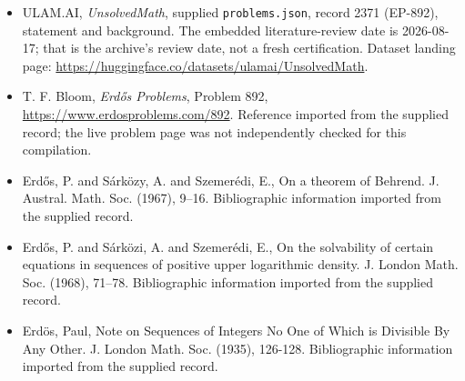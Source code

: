 \documentclass[11pt,a4paper]{article}
\begin{document}
{\small

\begin{itemize}

\item[\hypertarget{source:2371:1}{S1}] ULAM.AI, \emph{UnsolvedMath}, supplied \texttt{problems.json}, record 2371 (EP-892), statement and background. The embedded literature-review date is 2026-08-17; that is the archive’s review date, not a fresh certification. Dataset landing page: \url{https://huggingface.co/datasets/ulamai/UnsolvedMath}.

\item[\hypertarget{source:2371:2}{S2}] T. F. Bloom, \emph{Erdős Problems}, Problem 892, \url{https://www.erdosproblems.com/892}. Reference imported from the supplied record; the live problem page was not independently checked for this compilation.

\item[\hypertarget{source:2371:3}{S3}] Erd\H{o}s, P. and S\'{a}rk\"{o}zy, A. and Szemer\'{e}di, E., On a theorem of Behrend. J. Austral. Math. Soc. (1967), 9--16. Bibliographic information imported from the supplied record.

\item[\hypertarget{source:2371:4}{S4}] Erd\H{o}s, P. and S\'{a}rk\"{o}zi, A. and Szemer\'{e}di, E., On the solvability of certain equations in sequences of positive upper logarithmic density. J. London Math. Soc. (1968), 71--78. Bibliographic information imported from the supplied record.

\item[\hypertarget{source:2371:5}{S5}] Erd\"{o}s, Paul, Note on Sequences of Integers No One of Which is Divisible By Any Other. J. London Math. Soc. (1935), 126-128. Bibliographic information imported from the supplied record.

\end{itemize}

}

\label{end:2371}
\end{document}
